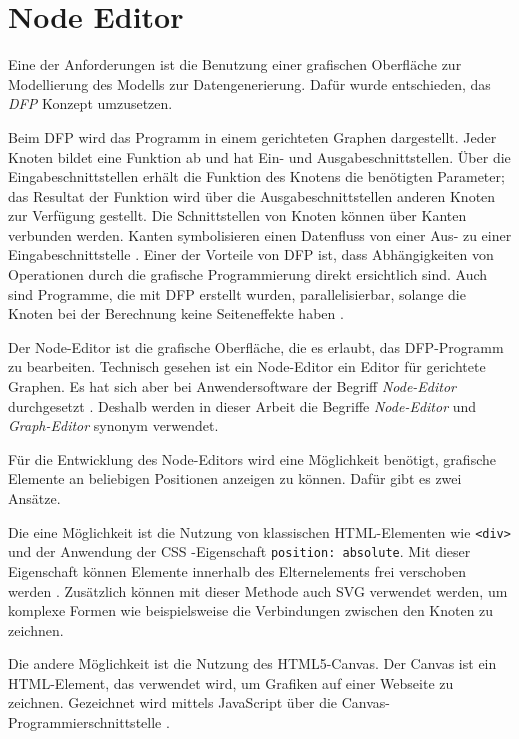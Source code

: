 \section{Node Editor}

Eine der Anforderungen ist die Benutzung einer grafischen Oberfläche zur Modellierung des Modells zur Datengenerierung. Dafür wurde entschieden, das \textit{\ac{DFP}} Konzept umzusetzen.

Beim \ac{DFP} wird das Programm in einem gerichteten Graphen dargestellt. Jeder Knoten bildet eine Funktion ab und hat Ein- und Ausgabeschnittstellen. Über die Eingabeschnittstellen erhält die Funktion des Knotens die benötigten Parameter; das Resultat der Funktion wird über die Ausgabeschnittstellen anderen Knoten zur Verfügung gestellt. Die Schnittstellen von Knoten können über Kanten verbunden werden. Kanten symbolisieren einen Datenfluss von einer Aus- zu einer Eingabeschnittstelle \cite{dataflow}. Einer der Vorteile von \ac{DFP} ist, dass Abhängigkeiten von Operationen durch die grafische Programmierung direkt ersichtlich sind. Auch sind Programme, die mit \ac{DFP} erstellt wurden, parallelisierbar, solange die Knoten bei der Berechnung keine Seiteneffekte haben \cite{dataflow}.

Der Node-Editor ist die grafische Oberfläche, die es erlaubt, das \ac{DFP}-Programm zu bearbeiten. Technisch gesehen ist ein Node-Editor ein Editor für gerichtete Graphen. Es hat sich aber bei Anwendersoftware der Begriff \textit{Node-Editor} durchgesetzt \cite{nodeeditor:blender, nodeeditor:maya}. Deshalb werden in dieser Arbeit die Begriffe \textit{Node-Editor} und \textit{Graph-Editor} synonym verwendet.

Für die Entwicklung des Node-Editors wird eine Möglichkeit benötigt, grafische Elemente an beliebigen Positionen anzeigen zu können. Dafür gibt es zwei Ansätze.

Die eine Möglichkeit ist die Nutzung von klassischen \ac{HTML}-Elementen wie \texttt{<div>} und der Anwendung der \ac{CSS}
-Eigenschaft \texttt{position: absolute}. Mit dieser Eigenschaft können Elemente innerhalb des Elternelements frei verschoben werden \cite{mdn:position}. Zusätzlich können mit dieser Methode auch \ac{SVG} verwendet werden, um komplexe Formen wie beispielsweise die Verbindungen zwischen den Knoten zu zeichnen.

Die andere Möglichkeit ist die Nutzung des HTML5-Canvas. Der Canvas ist ein HTML-Element, das verwendet wird, um Grafiken auf einer Webseite zu zeichnen. Gezeichnet wird mittels JavaScript über die Canvas-Programmierschnittstelle \cite{mdn:canvas}.

